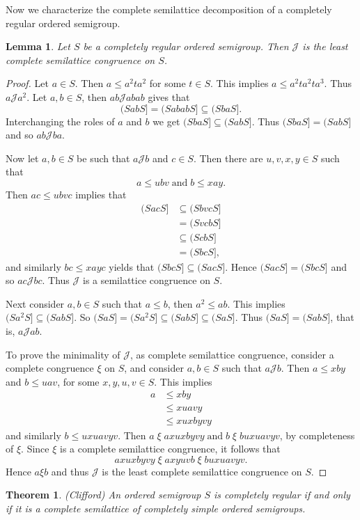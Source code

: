 \documentclass[13pt]{article}
\newtheorem{Theorem}[theorem]{Theorem}
\newtheorem{Lemma}[theorem]{Lemma}
\theoremstyle{definition}
\theoremstyle{remark}
\numberwithin{equation}{section}
\newcommand{\jc}{\mathcal{J}}
\begin{document}
Now we characterize the complete semilattice decomposition of a
completely regular ordered semigroup.
\begin{Lemma}\label{cr14}
Let $S$ be a completely regular ordered semigroup. Then $\jc$ is the
least complete semilattice congruence on  $S$.
\end{Lemma}
\begin{proof}
Let $a \in S$. Then $a \leq a^2 t a^2$ for some $t \in S$. This
implies  $a \leq a^2 ta^2 ta^3$. Thus $a \jc a^2$. Let $a, b \in S$,
then $ab \jc abab$ gives  that $$(SabS] = (SababS] \subseteq
(SbaS].$$ Interchanging the roles of $a$ and $b$ we get $(SbaS]
\subseteq (SabS]$. Thus $(SbaS] =(SabS]$ and so $ab \jc ba$.

Now let $a, b \in S$ be such that $a \jc b$ and $c \in S$. Then
there are $u, v, x, y \in S$ such that $$a \leq ubv \;\textrm{and}
\;b \leq xay.$$ Then $ac \leq ubvc$ implies that
\begin{align*}
(SacS] &\subseteq (SbvcS]\\
&=(SvcbS]\\
&\subseteq (ScbS]\\
&= (SbcS],
\end{align*}
and similarly $bc \leq xayc$ yields  that $(SbcS] \subseteq (SacS]$.
Hence $(SacS] = (SbcS]$ and so $ac \jc bc$. Thus $\jc $ is a
semilattice congruence on $S$.

Next  consider $a, b \in S $ such that $ a \leq b$, then $a^2 \leq
ab$. This   implies $(Sa^2S] \subseteq (SabS]$. So $(SaS]= (Sa^2S]
\subseteq (SabS] \subseteq (SaS]$. Thus $(SaS]= (SabS]$, that is, $a
\jc ab$.

To prove the minimality of $\jc$, as complete semilattice
congruence, consider a complete congruence $\xi$  on $S$, and
consider $a, b \in S$ such that $a \jc b$. Then $a \leq xby$ and $b
\leq uav$, for some $x, y, u, v \in S$. This  implies
\begin{align*}
a &\leq xby\\
  & \leq xuavy\\
  & \leq xuxbyvy
\end{align*}
and similarly  $b \leq uxuavyv$. Then $a \;\xi \;axuxbyvy
\;\textrm{and} \;b \;\xi \;buxuavyv $, by completeness of $\xi$.
Since $\xi$ is a complete semilattice congruence, it follows that
$$axuxbyvy \;\xi \;axyuvb \;\xi \;buxuavyv.$$
Hence $a \xi b$ and  thus $\jc$ is the least complete semilattice
congruence on $S$.
\end{proof}
\begin{Theorem}\label{cr15} (Clifford) An ordered semigroup $S$ is completely
regular if and only if it is a complete semilattice of  completely
simple ordered semigroups.
\end{Theorem}
\end{document}
